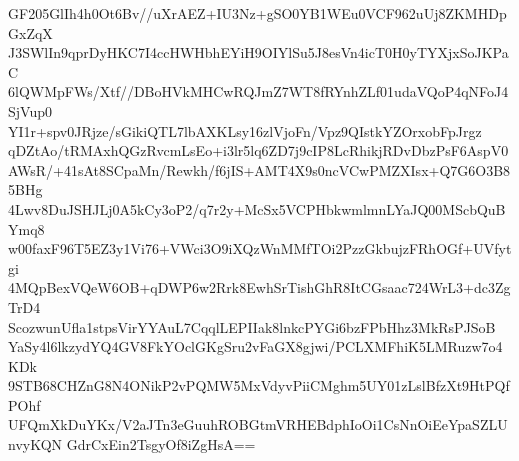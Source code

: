GF205GlIh4h0Ot6Bv//uXrAEZ+IU3Nz+gSO0YB1WEu0VCF962uUj8ZKMHDpGxZqX
J3SWlIn9qprDyHKC7I4ccHWHbhEYiH9OIYlSu5J8esVn4icT0H0yTYXjxSoJKPaC
6lQWMpFWs/Xtf//DBoHVkMHCwRQJmZ7WT8fRYnhZLf01udaVQoP4qNFoJ4SjVup0
YI1r+spv0JRjze/sGikiQTL7lbAXKLsy16zlVjoFn/Vpz9QIstkYZOrxobFpJrgz
qDZtAo/tRMAxhQGzRvcmLsEo+i3lr5lq6ZD7j9cIP8LcRhikjRDvDbzPsF6AspV0
AWsR/+41sAt8SCpaMn/Rewkh/f6jIS+AMT4X9s0ncVCwPMZXIsx+Q7G6O3B85BHg
4Lwv8DuJSHJLj0A5kCy3oP2/q7r2y+McSx5VCPHbkwmlmnLYaJQ00MScbQuBYmq8
w00faxF96T5EZ3y1Vi76+VWci3O9iXQzWnMMfTOi2PzzGkbujzFRhOGf+UVfytgi
4MQpBexVQeW6OB+qDWP6w2Rrk8EwhSrTishGhR8ItCGsaac724WrL3+dc3ZgTrD4
ScozwunUfla1stpsVirYYAuL7CqqlLEPIIak8lnkcPYGi6bzFPbHhz3MkRsPJSoB
YaSy4l6lkzydYQ4GV8FkYOclGKgSru2vFaGX8gjwi/PCLXMFhiK5LMRuzw7o4KDk
9STB68CHZnG8N4ONikP2vPQMW5MxVdyvPiiCMghm5UY01zLslBfzXt9HtPQfPOhf
UFQmXkDuYKx/V2aJTn3eGuuhROBGtmVRHEBdphIoOi1CsNnOiEeYpaSZLUnvyKQN
GdrCxEin2TsgyOf8iZgHsA==
